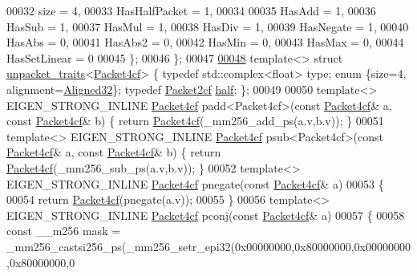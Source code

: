 \begin{DoxyCode}
00032     size = 4,
00033     HasHalfPacket = 1,
00034 
00035     HasAdd    = 1,
00036     HasSub    = 1,
00037     HasMul    = 1,
00038     HasDiv    = 1,
00039     HasNegate = 1,
00040     HasAbs    = 0,
00041     HasAbs2   = 0,
00042     HasMin    = 0,
00043     HasMax    = 0,
00044     HasSetLinear = 0
00045   \};
00046 \};
00047 
\hyperlink{struct_eigen_1_1internal_1_1unpacket__traits_3_01_packet4cf_01_4}{00048} \textcolor{keyword}{template}<> \textcolor{keyword}{struct }\hyperlink{struct_eigen_1_1internal_1_1unpacket__traits}{unpacket\_traits}<\hyperlink{struct_eigen_1_1internal_1_1_packet4cf}{Packet4cf}> \{ \textcolor{keyword}{typedef} std::complex<float> type; \textcolor{keyword}{
      enum} \{size=4, alignment=\hyperlink{group__enums_gga45fe06e29902b7a2773de05ba27b47a1a7797d247b86f6e9837cc338beb6060de}{Aligned32}\}; \textcolor{keyword}{typedef} \hyperlink{struct_eigen_1_1internal_1_1_packet2cf}{Packet2cf} \hyperlink{struct_eigen_1_1internal_1_1_packet2cf}{half}; \};
00049 
00050 \textcolor{keyword}{template}<> EIGEN\_STRONG\_INLINE \hyperlink{struct_eigen_1_1internal_1_1_packet4cf}{Packet4cf} padd<Packet4cf>(\textcolor{keyword}{const} 
      \hyperlink{struct_eigen_1_1internal_1_1_packet4cf}{Packet4cf}& a, \textcolor{keyword}{const} \hyperlink{struct_eigen_1_1internal_1_1_packet4cf}{Packet4cf}& b) \{ \textcolor{keywordflow}{return} \hyperlink{struct_eigen_1_1internal_1_1_packet4cf}{Packet4cf}(\_mm256\_add\_ps(a.v,b.v)); \}
00051 \textcolor{keyword}{template}<> EIGEN\_STRONG\_INLINE \hyperlink{struct_eigen_1_1internal_1_1_packet4cf}{Packet4cf} psub<Packet4cf>(\textcolor{keyword}{const} 
      \hyperlink{struct_eigen_1_1internal_1_1_packet4cf}{Packet4cf}& a, \textcolor{keyword}{const} \hyperlink{struct_eigen_1_1internal_1_1_packet4cf}{Packet4cf}& b) \{ \textcolor{keywordflow}{return} \hyperlink{struct_eigen_1_1internal_1_1_packet4cf}{Packet4cf}(\_mm256\_sub\_ps(a.v,b.v)); \}
00052 \textcolor{keyword}{template}<> EIGEN\_STRONG\_INLINE \hyperlink{struct_eigen_1_1internal_1_1_packet4cf}{Packet4cf} pnegate(\textcolor{keyword}{const} \hyperlink{struct_eigen_1_1internal_1_1_packet4cf}{Packet4cf}& a)
00053 \{
00054   \textcolor{keywordflow}{return} \hyperlink{struct_eigen_1_1internal_1_1_packet4cf}{Packet4cf}(pnegate(a.v));
00055 \}
00056 \textcolor{keyword}{template}<> EIGEN\_STRONG\_INLINE \hyperlink{struct_eigen_1_1internal_1_1_packet4cf}{Packet4cf} pconj(\textcolor{keyword}{const} \hyperlink{struct_eigen_1_1internal_1_1_packet4cf}{Packet4cf}& a)
00057 \{
00058   \textcolor{keyword}{const} \_\_m256 mask = \_mm256\_castsi256\_ps(\_mm256\_setr\_epi32(0x00000000,0x80000000,0x00000000,0x80000000,0

\end{DoxyCode}
